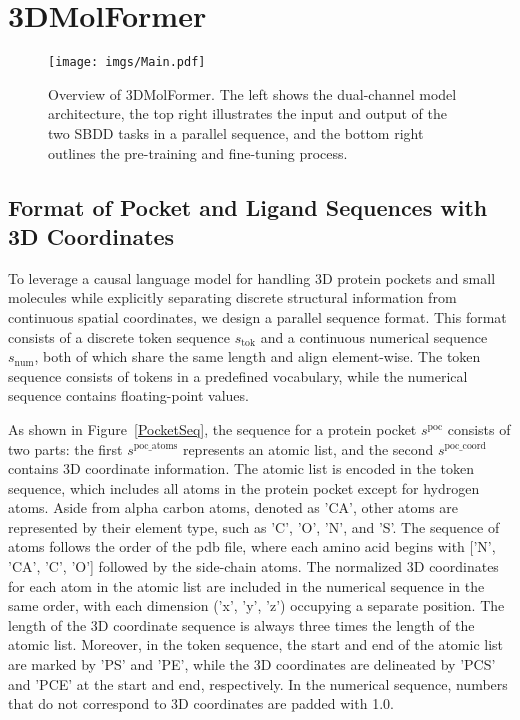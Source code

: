 \section{3DMolFormer}
\begin{figure}[t]
    \centering
    \texttt{[image: imgs/Main.pdf]}
    \vspace{-0.4cm}
    \caption{Overview of 3DMolFormer. The left shows the dual-channel model architecture, the top right illustrates the input and output of the two SBDD tasks in a parallel sequence, and the bottom right outlines the pre-training and fine-tuning process.}
    \label{Overview}
    \vspace{-0.2cm}
\end{figure}

\subsection{Format of Pocket and Ligand Sequences with 3D Coordinates}

To leverage a causal language model for handling 3D protein pockets and small molecules while explicitly separating discrete structural information from continuous spatial coordinates, we design a parallel sequence format. This format consists of a discrete token sequence $s_\mathrm{tok}$ and a continuous numerical sequence $s_\mathrm{num}$, both of which share the same length and align element-wise. The token sequence consists of tokens in a predefined vocabulary, while the numerical sequence contains floating-point values.

As shown in Figure~\ref{PocketSeq}, the sequence for a protein pocket $s^\mathrm{poc}$ consists of two parts: the first $s^\mathrm{poc\_atoms}$ represents an atomic list, and the second $s^\mathrm{poc\_coord}$ contains 3D coordinate information. 
The atomic list is encoded in the token sequence, which includes all atoms in the protein pocket except for hydrogen atoms. Aside from alpha carbon atoms, denoted as 'CA', other atoms are represented by their element type, such as 'C', 'O', 'N', and 'S'. The sequence of atoms follows the order of the pdb file, where each amino acid begins with ['N', 'CA', 'C', 'O'] followed by the side-chain atoms.
The normalized 3D coordinates for each atom in the atomic list are included in the numerical sequence in the same order, with each dimension ('x', 'y', 'z') occupying a separate position. The length of the 3D coordinate sequence is always three times the length of the atomic list.
Moreover, in the token sequence, the start and end of the atomic list are marked by 'PS' and 'PE', while the 3D coordinates are delineated by 'PCS' and 'PCE' at the start and end, respectively.
In the numerical sequence, numbers that do not correspond to 3D coordinates are padded with 1.0.

